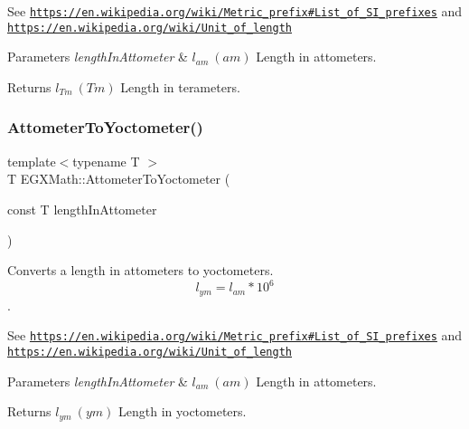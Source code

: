 See \href{https://en.wikipedia.org/wiki/Metric_prefix#List_of_SI_prefixes}{\tt https\+://en.\+wikipedia.\+org/wiki/\+Metric\+\_\+prefix\#\+List\+\_\+of\+\_\+\+S\+I\+\_\+prefixes} and \href{https://en.wikipedia.org/wiki/Unit_of_length}{\tt https\+://en.\+wikipedia.\+org/wiki/\+Unit\+\_\+of\+\_\+length} 
\begin{DoxyParams}{Parameters}
{\em length\+In\+Attometer} & $ l_{am}\ (am)$ Length in attometers. \\
\hline
\end{DoxyParams}
\begin{DoxyReturn}{Returns}
$ l_{Tm}\ (Tm)$ Length in terameters. 
\end{DoxyReturn}
\mbox{\label{group___e_g_x_math-_conversions-_length_conversions-_s_i-_attometer-_s_i_gaf325d426b8544c973b0f140b0d4e0f06}} 
\subsubsection{\texorpdfstring{Attometer\+To\+Yoctometer()}{AttometerToYoctometer()}}
{\footnotesize\ttfamily template$<$typename T $>$ \\
T E\+G\+X\+Math\+::\+Attometer\+To\+Yoctometer (\begin{DoxyParamCaption}\item[{const T}]{length\+In\+Attometer }\end{DoxyParamCaption})}



Converts a length in attometers to yoctometers. \[ l_{ym}=l_{am} * 10^{6} \]. 

See \href{https://en.wikipedia.org/wiki/Metric_prefix#List_of_SI_prefixes}{\tt https\+://en.\+wikipedia.\+org/wiki/\+Metric\+\_\+prefix\#\+List\+\_\+of\+\_\+\+S\+I\+\_\+prefixes} and \href{https://en.wikipedia.org/wiki/Unit_of_length}{\tt https\+://en.\+wikipedia.\+org/wiki/\+Unit\+\_\+of\+\_\+length} 
\begin{DoxyParams}{Parameters}
{\em length\+In\+Attometer} & $ l_{am}\ (am)$ Length in attometers. \\
\hline
\end{DoxyParams}
\begin{DoxyReturn}{Returns}
$ l_{ym}\ (ym)$ Length in yoctometers. 
\end{DoxyReturn}
\mbox{\label{group___e_g_x_math-_conversions-_length_conversions-_s_i-_attometer-_s_i_gaaa5d4078879169021c8f2857c02a7aed}} 
